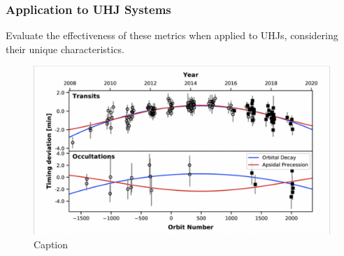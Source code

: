 \documentclass[oneside,12pt]{amsart}
\numberwithin{page}{section}
\begin{document}


\subsubsection{Application to UHJ Systems}
Evaluate the effectiveness of these metrics when applied to UHJs, considering their unique characteristics.

\begin{figure}[htbp]
    \centering
    \includegraphics[width=0.5\linewidth]{figs/yee_fig4.png}
    \caption{Caption}
    \label{fig:enter-label}
\end{figure}
\end{document}
